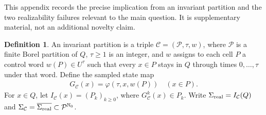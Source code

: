 \documentclass[11pt,a4paper]{article}
\theoremstyle{definition}
\newtheorem{definition}[theorem]{Definition}
\theoremstyle{remark}
\begin{document}
This appendix records the precise implication from an invariant partition and the two realizability failures relevant to the main question. It is supplementary material, not an additional novelty claim.

\begin{definition}
An invariant partition is a triple \(\mathcal C=(\mathcal P,\tau,w)\), where \(\mathcal P\) is a finite Borel partition of \(Q\), \(\tau\geq1\) is an integer, and \(w\) assigns to each cell \(P\) a control word \(w(P)\in U^\tau\) such that every \(x\in P\) stays in \(Q\) through times \(0,\ldots,\tau\) under that word. Define the sampled state map
\begin{align*}
 G_{\mathcal C}(x)=\varphi(\tau,x,w(P))\quad(x\in P).
\end{align*}
For \(x\in Q\), let \(I_{\mathcal C}(x)=(P_k)_{k\geq0}\), where \(G_{\mathcal C}^k(x)\in P_k\). Write
\(\Sigma_{\rm real}=I_{\mathcal C}(Q)\) and
\(\Sigma_{\mathcal C}=\overline{\Sigma_{\rm real}}\subset\mathcal P^{\mathbb N_0}\).
\end{definition}
\end{document}
